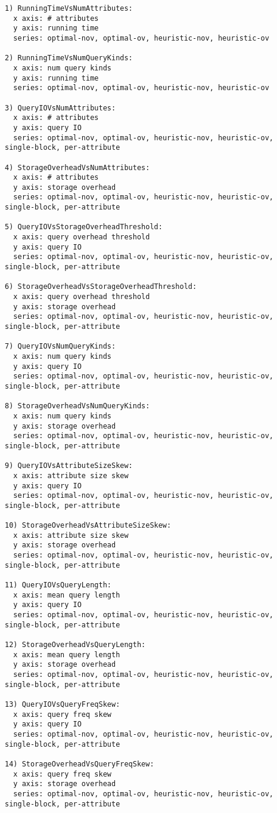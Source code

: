 \begin{verbatim}
1) RunningTimeVsNumAttributes:
  x axis: # attributes
  y axis: running time
  series: optimal-nov, optimal-ov, heuristic-nov, heuristic-ov

2) RunningTimeVsNumQueryKinds:
  x axis: num query kinds
  y axis: running time
  series: optimal-nov, optimal-ov, heuristic-nov, heuristic-ov

3) QueryIOVsNumAttributes:
  x axis: # attributes
  y axis: query IO
  series: optimal-nov, optimal-ov, heuristic-nov, heuristic-ov, single-block, per-attribute

4) StorageOverheadVsNumAttributes:
  x axis: # attributes
  y axis: storage overhead
  series: optimal-nov, optimal-ov, heuristic-nov, heuristic-ov, single-block, per-attribute
  
5) QueryIOVsStorageOverheadThreshold:
  x axis: query overhead threshold
  y axis: query IO
  series: optimal-nov, optimal-ov, heuristic-nov, heuristic-ov, single-block, per-attribute

6) StorageOverheadVsStorageOverheadThreshold:
  x axis: query overhead threshold
  y axis: storage overhead
  series: optimal-nov, optimal-ov, heuristic-nov, heuristic-ov, single-block, per-attribute

7) QueryIOVsNumQueryKinds:
  x axis: num query kinds
  y axis: query IO
  series: optimal-nov, optimal-ov, heuristic-nov, heuristic-ov, single-block, per-attribute

8) StorageOverheadVsNumQueryKinds:
  x axis: num query kinds
  y axis: storage overhead
  series: optimal-nov, optimal-ov, heuristic-nov, heuristic-ov, single-block, per-attribute

9) QueryIOVsAttributeSizeSkew:
  x axis: attribute size skew
  y axis: query IO
  series: optimal-nov, optimal-ov, heuristic-nov, heuristic-ov, single-block, per-attribute

10) StorageOverheadVsAttributeSizeSkew:
  x axis: attribute size skew
  y axis: storage overhead
  series: optimal-nov, optimal-ov, heuristic-nov, heuristic-ov, single-block, per-attribute

11) QueryIOVsQueryLength:
  x axis: mean query length
  y axis: query IO
  series: optimal-nov, optimal-ov, heuristic-nov, heuristic-ov, single-block, per-attribute

12) StorageOverheadVsQueryLength:
  x axis: mean query length
  y axis: storage overhead
  series: optimal-nov, optimal-ov, heuristic-nov, heuristic-ov, single-block, per-attribute

13) QueryIOVsQueryFreqSkew:
  x axis: query freq skew
  y axis: query IO
  series: optimal-nov, optimal-ov, heuristic-nov, heuristic-ov, single-block, per-attribute

14) StorageOverheadVsQueryFreqSkew:
  x axis: query freq skew
  y axis: storage overhead
  series: optimal-nov, optimal-ov, heuristic-nov, heuristic-ov, single-block, per-attribute
\end{verbatim}